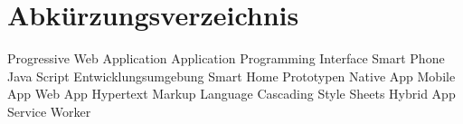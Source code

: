 \chapter*{Abkürzungsverzeichnis}
\pagestyle{plain}

\begin{acronym}[AUTOSAR]

   				{Progressive Web Application}
  				{Application Programming Interface}
  				{Smart Phone}
  				{Java Script}
  				{Entwicklungsumgebung}
  				{Smart Home Prototypen}
  				{Native App}
  				{Mobile App}
 					{Web App}
 				{Hypertext Markup Language}
 				{Cascading Style Sheets}
 				{Hybrid App}
 					{Service Worker}
\end{acronym}